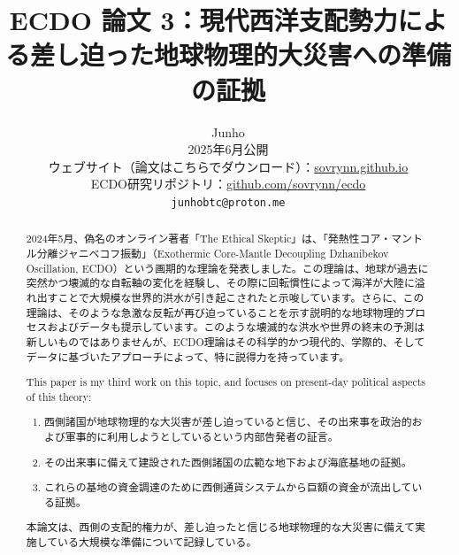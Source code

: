 \documentclass[10pt,twocolumn,letterpaper]{article}
\begin{document}
\title{ECDO 論文 3：現代西洋支配勢力による差し迫った地球物理的大災害への準備の証拠}

\author{Junho\\
2025年6月公開\\
ウェブサイト（論文はこちらでダウンロード）：\href{https://sovrynn.github.io}{sovrynn.github.io}\\
ECDO研究リポジトリ：\href{https://github.com/sovrynn/ecdo}{github.com/sovrynn/ecdo}\\
{\tt\small junhobtc@proton.me}
}

\maketitle

\begin{abstract}
2024年5月、偽名のオンライン著者「The Ethical Skeptic」\cite{0}は、「発熱性コア・マントル分離ジャニベコフ振動」（Exothermic Core-Mantle Decoupling Dzhanibekov Oscillation, ECDO）\cite{1}という画期的な理論を発表しました。この理論は、地球が過去に突然かつ壊滅的な自転軸の変化を経験し、その際に回転慣性によって海洋が大陸に溢れ出すことで大規模な世界的洪水が引き起こされたと示唆しています。さらに、この理論は、そのような急激な反転が再び迫っていることを示す説明的な地球物理的プロセスおよびデータも提示しています。このような壊滅的な洪水や世界の終末の予測は新しいものではありませんが、ECDO理論はその科学的かつ現代的、学際的、そしてデータに基づいたアプローチによって、特に説得力を持っています。

This paper is my third work \cite{2,3} on this topic, and focuses on present-day political aspects of this theory:
\begin{flushleft}
\begin{enumerate}
    \item 西側諸国が地球物理的な大災害が差し迫っていると信じ、その出来事を政治的および軍事的に利用しようとしているという内部告発者の証言。
    \item その出来事に備えて建設された西側諸国の広範な地下および海底基地の証拠。
    \item これらの基地の資金調達のために西側通貨システムから巨額の資金が流出している証拠。
\end{enumerate}
\end{flushleft}

本論文は、西側の支配的権力が、差し迫ったと信じる地球物理的な大災害に備えて実施している大規模な準備について記録している。
\end{abstract}
\end{document}
